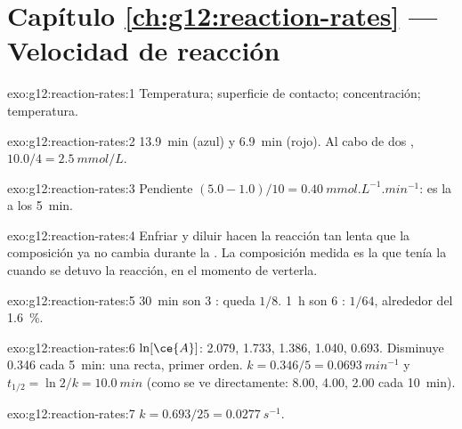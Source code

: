 \section*{Capítulo \ref{ch:g12:reaction-rates} --- Velocidad de reacción}

\begin{solution}{exo:g12:reaction-rates:1}
Temperatura; superficie de contacto; concentración; temperatura.
\end{solution}

\begin{solution}{exo:g12:reaction-rates:2}
\qty{13.9}{min} (azul) y \qty{6.9}{min} (rojo). Al cabo de dos ,
$10.0 / 4 = \qty{2.5}{mmol/L}$.
\end{solution}

\begin{solution}{exo:g12:reaction-rates:3}
Pendiente $(5.0 - 1.0)/10 = \qty{0.40}{mmol.L^{-1}.min^{-1}}$: es la
 a los \qty{5}{min}.
\end{solution}

\begin{solution}{exo:g12:reaction-rates:4}
Enfriar y diluir hacen la reacción tan lenta que la composición ya no
cambia durante la . La composición medida es la que tenía la
 cuando se detuvo la reacción, en el momento de verterla.
\end{solution}

\begin{solution}{exo:g12:reaction-rates:5}
\qty{30}{min} son 3 : queda $1/8$. \qty{1}{h}
son 6 : $1/64$, alrededor del
\qty{1.6}{\percent}.
\end{solution}

\begin{solution}{exo:g12:reaction-rates:6}
$\ln[\ce{A}]$: 2.079, 1.733, 1.386, 1.040, 0.693. Disminuye 0.346 cada
\qty{5}{min}: una recta, primer orden. $k = 0.346/5 =
\qty{0.0693}{min^{-1}}$ y $t_{1/2} = \ln 2 / k = \qty{10.0}{min}$ (como
se ve directamente: 8.00, 4.00, 2.00 cada \qty{10}{min}).
\end{solution}

\begin{solution}{exo:g12:reaction-rates:7}
$k = 0.693 / 25 = \qty{0.0277}{s^{-1}}$.
\end{solution}

